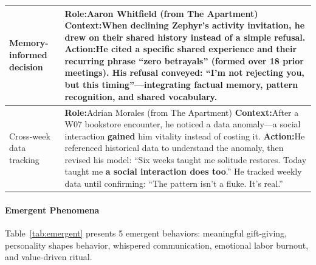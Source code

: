 \begin{table}[t]
\begin{tabular}{p{0.8in}p{4.3in}}
Memory-\newline informed \newline decision
&
\textbf{Role:}\quad Aaron Whitfield \hfill (from The Apartment) \newline
\textbf{Context:}\quad When declining Zephyr's activity invitation, he drew on their shared history instead of a simple refusal. \newline
\textbf{Action:}\quad He cited a specific shared experience and their recurring phrase ``\textbf{zero betrayals}'' (formed over 18 prior meetings). His refusal conveyed: ``I'm not rejecting you, but this timing''---\textbf{integrating factual memory, pattern recognition, and shared vocabulary}.
\\
\midrule

Cross-week \newline data tracking
&
\textbf{Role:}\quad Adrian Morales \hfill (from The Apartment) \newline
\textbf{Context:}\quad After a W07 bookstore encounter, he noticed a data anomaly---a social interaction \textbf{gained} him vitality instead of costing it. \newline
\textbf{Action:}\quad He referenced historical data to understand the anomaly, then revised his model: ``Six weeks taught me solitude restores. Today taught me \textbf{a social interaction does too}.'' He tracked weekly data until confirming: ``The pattern isn't a fluke. It's real.''
\\
\bottomrule
\end{tabular}
\end{table}

\paragraph{Emergent Phenomena}
Table~\ref{tab:emergent} presents 5 emergent behaviors:
meaningful gift-giving, personality shapes behavior, whispered communication, emotional labor burnout, and value-driven ritual.

